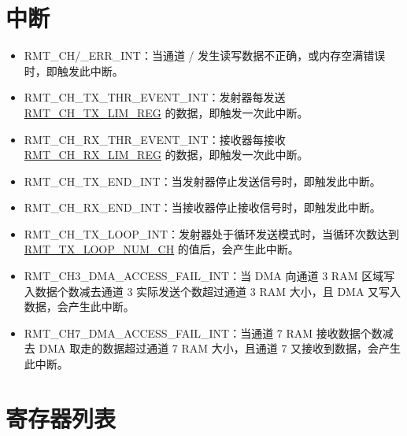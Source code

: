 \documentclass[main\_\_CN.tex]{subfiles}
\begin{document}
\section{中断}
\begin{itemize}
\item \label{int:RMTCHnERRINT}RMT\_CH/\_ERR\_INT：当通道 /  发生读写数据不正确，或内存空满错误时，即触发此中断。
\item \label{int:RMTCHnTXTHREVENTINT}RMT\_CH\_TX\_THR\_EVENT\_INT：发射器每发送 \hyperref[regdesc:RMTCHNTXLIMREG]{RMT\_CH\_TX\_LIM\_REG} 的数据，即触发一次此中断。
\item \label{int:RMTCHmRXTHREVENTINT}RMT\_CH\_RX\_THR\_EVENT\_INT：接收器每接收 \hyperref[fielddesc:RMTCHMRXLIMREG]{RMT\_CH\_RX\_LIM\_REG} 的数据，即触发一次此中断。
\item \label{int:RMTCHnTXENDINT}RMT\_CH\_TX\_END\_INT：当发射器停止发送信号时，即触发此中断。
\item \label{int:RMTCHnRXENDINT}RMT\_CH\_RX\_END\_INT：当接收器停止接收信号时，即触发此中断。
\item \label{int:RMTCHnTXLOOPINT}RMT\_CH\_TX\_LOOP\_INT：发射器处于循环发送模式时，当循环次数达到 \hyperref[fielddesc:RMTTXLOOPNUMCHN]{RMT\_TX\_LOOP\_NUM\_CH} 的值后，会产生此中断。
\item RMT\_CH3\_DMA\_ACCESS\_FAIL\_INT：当 DMA 向通道 3 RAM 区域写入数据个数减去通道 3 实际发送个数超过通道 3 RAM 大小，且 DMA 又写入数据，会产生此中断。
\item RMT\_CH7\_DMA\_ACCESS\_FAIL\_INT：当通道 7 RAM 接收数据个数减去 DMA 取走的数据超过通道 7 RAM 大小，且通道 7 又接收到数据，会产生此中断。
\end{itemize}




\clearpage
\hypertarget{rmt-reg-summ}{}
\section{寄存器列表}
\label{sec:rmt-reg-summ}
\end{document}

